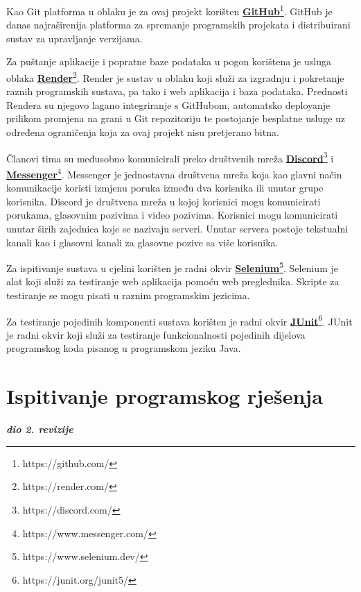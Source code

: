 			Kao Git platforma u oblaku je za ovaj projekt korišten \href{https://github.com/}{\textbf{GitHub}}\footnote{https://github.com/}. GitHub je danas najraširenija platforma za spremanje programskih projekata i distribuirani sustav za upravljanje verzijama.
			
			Za puštanje aplikacije i popratne baze podataka u pogon korištena je usluga oblaka \href{https://render.com/}{\textbf{Render}}\footnote{https://render.com/}. Render je sustav u oblaku koji služi za izgradnju i pokretanje raznih programskih sustava, pa tako i web aplikacija i baza podataka. Prednosti Rendera su njegovo lagano integriranje s GitHubom, automatsko deployanje prilikom promjena na grani u Git repozitoriju te postojanje besplatne usluge uz određena ograničenja koja za ovaj projekt nisu pretjerano bitna.
			
			Članovi tima su međusobno komunicirali preko društvenih mreža \href{https://discord.com/}{\textbf{Discord}}\footnote{https://discord.com/} i \href{https://www.messenger.com/}{\textbf{Messenger}}\footnote{https://www.messenger.com/}. Messenger je jednostavna društvena mreža koja kao glavni način komunikacije koristi izmjenu poruka između dva korisnika ili unutar grupe korisnika. Discord je društvena mreža u kojoj korisnici mogu komunicirati porukama, glasovnim pozivima i video pozivima. Korisnici mogu komunicirati unutar širih zajednica koje se nazivaju serveri. Unutar servera postoje tekstualni kanali kao i glasovni kanali za glasovne pozive sa više korisnika.
			
			Za ispitivanje sustava u cjelini korišten je radni okvir \href{https://www.selenium.dev/}{\textbf{Selenium}}\footnote{https://www.selenium.dev/}. Selenium je alat koji služi za testiranje web aplikacija pomoću web preglednika. Skripte za testiranje se mogu pisati u raznim programskim jezicima. 
			
			Za testiranje pojedinih komponenti sustava korišten je radni okvir \href{https://junit.org/junit5/}{\textbf{JUnit}}\footnote{https://junit.org/junit5/}. JUnit je radni okvir koji služi za testiranje funkcionalnosti pojedinih dijelova programskog koda pisanog u programskom jeziku Java.
			
			\eject 
		
	
		\section{Ispitivanje programskog rješenja}
			
			\textbf{\textit{dio 2. revizije}}\\
			
